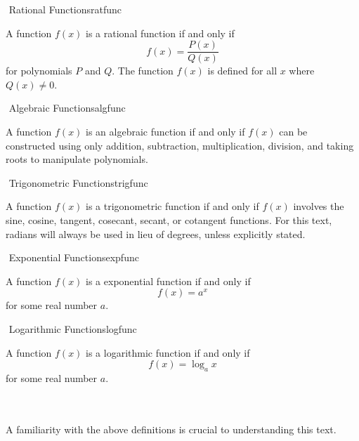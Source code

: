 		\begin{definition}{\Stop\,\,Rational Functions}{ratfunc}

			A function \(f(x)\) is a rational function if and only if 
			\begin{equation*}
				f(x)=\frac{P(x)}{Q(x)}
			\end{equation*}
			for polynomials \(P\) and \(Q\). The function \(f(x)\) is defined for all \(x\) where \(Q(x)\neq0\).
			
		\end{definition}
		\begin{definition}{\Stop\,\,Algebraic Functions}{algfunc}

			A function \(f(x)\) is an algebraic function if and only if \(f(x)\) can be constructed using only addition, subtraction, multiplication, division, and taking roots to manipulate polynomials.
			
		\end{definition}
		\begin{definition}{\Stop\,\,Trigonometric Functions}{trigfunc}

			A function \(f(x)\) is a trigonometric function if and only if \(f(x)\) involves the sine, cosine, tangent, cosecant, secant, or cotangent functions. For this text, radians will always be used in lieu of degrees, unless explicitly stated. 
			
		\end{definition}
		\begin{definition}{\Stop\,\,Exponential Functions}{expfunc}

			A function \(f(x)\) is a exponential function if and only if
			\begin{equation*}
				f(x)=a^x
			\end{equation*}
			for some real number \(a\).
			
		\end{definition}
		\begin{definition}{\Stop\,\,Logarithmic Functions}{logfunc}

			A function \(f(x)\) is a logarithmic function if and only if
			\begin{equation*}
				f(x)=\log_ax
			\end{equation*}
			for some real number \(a\).
			
		\end{definition}
		\vphantom
		\\
		\\
		A familiarity with the above definitions is crucial to understanding this text.
	
